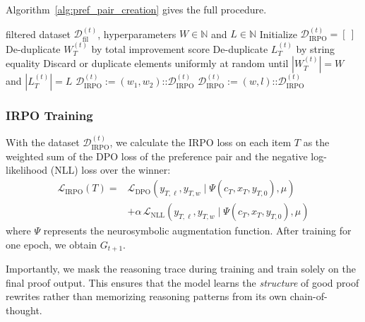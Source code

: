 Algorithm~\ref{alg:pref_pair_creation} gives the full procedure.

\begin{algorithm}[tb]
  \caption{Preference Pair Creation}
  \label{alg:pref_pair_creation}
  \begin{algorithmic}
     filtered dataset $\mathcal{D}_{\text{fil}}^{(t)}$, hyperparameters $W \in \mathbb{N}$ and $L \in \mathbb{N}$
    \STATE Initialize $\mathcal{D}_{\text{IRPO}}^{(t)} = [ \ ]$
        \STATE De-duplicate $W_T^{(t)}$ by total improvement score
        \STATE De-duplicate $L_T^{(t)}$ by string equality
        \STATE Discard or duplicate elements uniformly at random until $|W_T^{(t)}|=W$ and $|L_T^{(t)}|=L$
                    \STATE $\mathcal{D}_{\text{IRPO}}^{(t)} := (w_1, w_2) \texttt{::} \mathcal{D}_{\text{IRPO}}^{(t)}$
                \ENDIF
            \ENDFOR
        \ENDFOR
                \STATE $\mathcal{D}_{\text{IRPO}}^{(t)} := (w, l) \texttt{::} \mathcal{D}_{\text{IRPO}}^{(t)}$
            \ENDFOR
        \ENDFOR
    \ENDFOR
  \end{algorithmic}
\end{algorithm}


\subsubsection{IRPO Training}
\label{sec:irpo_ch}

With the dataset $\mathcal{D}_{\text{IRPO}}^{(t)}$, we calculate the IRPO loss on each item $T$ as the weighted sum of the DPO loss of the preference pair and the negative log-likelihood (NLL) loss over the winner:
\begin{align*}
\mathcal{L}_{\text{IRPO}}(T) ={}& \mathcal{L}_{\text{DPO}}(y_{T,\ell},y_{T,w} \mid \Psi(c_T,x_T,y_{T,0}),\mu) \\
&+ \alpha\,\mathcal{L}_{\text{NLL}}(y_{T,\ell},y_{T,w} \mid \Psi(c_T,x_T,y_{T,0}),\mu)
\end{align*}
where $\Psi$ represents the neurosymbolic augmentation function. After training for one epoch, we obtain $G_{t+1}$.

Importantly, we mask the reasoning trace during training and train solely on the final proof output. This ensures that the model learns the \emph{structure} of good proof rewrites rather than memorizing reasoning patterns from its own chain-of-thought.


